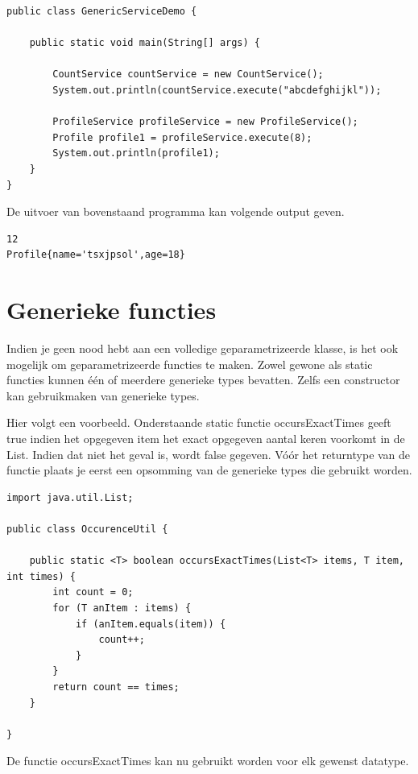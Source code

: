\begin{lstlisting}
public class GenericServiceDemo {

	public static void main(String[] args) {

		CountService countService = new CountService();
		System.out.println(countService.execute("abcdefghijkl"));

		ProfileService profileService = new ProfileService();
		Profile profile1 = profileService.execute(8);
		System.out.println(profile1);
	}
}
\end{lstlisting}

De uitvoer van bovenstaand programma kan volgende output geven.
\begin{verbatim}
12
Profile{name='tsxjpsol',age=18}
\end{verbatim}


\section{Generieke functies}

Indien je geen nood hebt aan een volledige geparametrizeerde klasse, is het ook mogelijk om geparametrizeerde functies te maken. Zowel gewone als static functies kunnen \'e\'en of meerdere generieke types bevatten. Zelfs een constructor kan gebruikmaken van  generieke types.

Hier volgt een voorbeeld. 
Onderstaande static functie occursExactTimes geeft true indien het opgegeven item het exact opgegeven aantal keren voorkomt in de List. Indien dat niet het geval is, wordt false gegeven.
V\'o\'or het returntype van de functie plaats je eerst een opsomming van de generieke types die gebruikt worden. 
 
\begin{lstlisting}
import java.util.List;

public class OccurenceUtil {

	public static <T> boolean occursExactTimes(List<T> items, T item, int times) {
		int count = 0;
		for (T anItem : items) {
			if (anItem.equals(item)) {
				count++;
			}
		}
		return count == times;
	}

}
\end{lstlisting}

De functie occursExactTimes kan nu gebruikt worden voor elk gewenst datatype.

